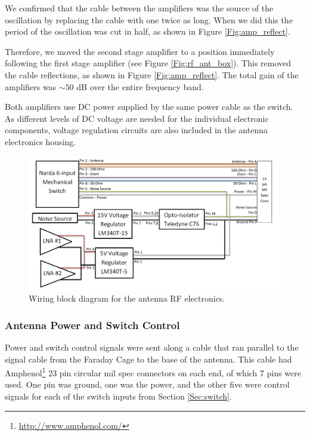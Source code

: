We confirmed that the cable between the amplifiers was the source of the oscillation by replacing the cable with one twice as long. When we did this the period of the oscillation was cut in half, as shown in Figure \ref{Fig:amp_reflect}. 

Therefore, we moved the second stage amplifier to a position immediately following the first stage amplifier (see Figure \ref{Fig:rf_ant_box}). This removed the cable reflections, as shown in Figure \ref{Fig:amp_reflect}. The total gain of the amplifiers was $\sim 50$ dB over the entire frequency band. 

Both amplifiers use DC power supplied by the same power cable as the switch. As different levels of DC voltage are needed for the individual electronic components, voltage regulation circuits are also included in the antenna electronics housing. 

\begin{figure}[htb]
\begin{center}
\includegraphics[width=0.9\linewidth]{SCIHI_system/figures/antenna_rf_power_block_diagram.png}
\caption{Wiring block diagram for the antenna RF electronics.}
\label{Fig:ant_RF_pow_block_diagram}
\end{center}
\end{figure}

\subsubsection{Antenna Power and Switch Control} \label{Sec:ant_pow}

Power and switch control signals were sent along a cable that ran parallel to the signal cable from the Faraday Cage to the base of the antenna. This cable had Amphenol\footnote{\url{http://www.amphenol.com/}} 23 pin circular mil spec connectors on each end, of which 7 pins were used. One pin was ground, one was the power, and the other five were control signals for each of the switch inputs from Section \ref{Sec:switch}. 

